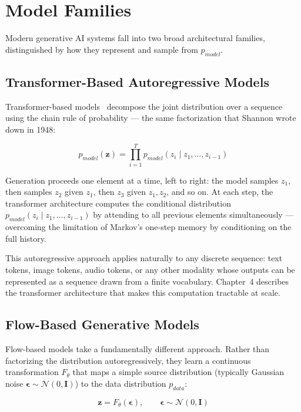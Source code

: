 \documentclass{book}
\begin{document}
\section{Model Families}

Modern generative AI systems fall into two broad architectural families,
distinguished by how they represent and sample from $p_{model}$.

\subsection{Transformer-Based Autoregressive Models}

Transformer-based models~\cite{vaswani2017attention} decompose the joint
distribution over a sequence using the chain rule of probability ---
the same factorization that Shannon wrote down in 1948:

\begin{equation}
p_{model}(\mathbf{z})
    = \prod_{i=1}^{T} p_{model}(z_i \mid z_1, \ldots, z_{i-1})
\end{equation}

Generation proceeds one element at a time, left to right: the model samples
$z_1$, then samples $z_2$ given $z_1$, then $z_3$ given $z_1, z_2$, and so
on. At each step, the transformer architecture computes the conditional
distribution $p_{model}(z_i \mid z_1, \ldots, z_{i-1})$ by attending to all
previous elements simultaneously --- overcoming the limitation of Markov's
one-step memory by conditioning on the full history.

This autoregressive approach applies naturally to any discrete sequence:
text tokens, image tokens, audio tokens, or any other modality whose outputs
can be represented as a sequence drawn from a finite vocabulary. Chapter~4
describes the transformer architecture that makes this computation tractable
at scale.

\subsection{Flow-Based Generative Models}

Flow-based models take a fundamentally different approach. Rather than
factorizing the distribution autoregressively, they learn a continuous
transformation $F_\theta$ that maps a simple source distribution (typically
Gaussian noise $\mathbf{\epsilon} \sim \mathcal{N}(0, \mathbf{I})$) to the
data distribution $p_{data}$:

\begin{equation}
\mathbf{z} = F_\theta(\mathbf{\epsilon}), \qquad \mathbf{\epsilon} \sim
\mathcal{N}(0, \mathbf{I})
\end{equation}
\end{document}
